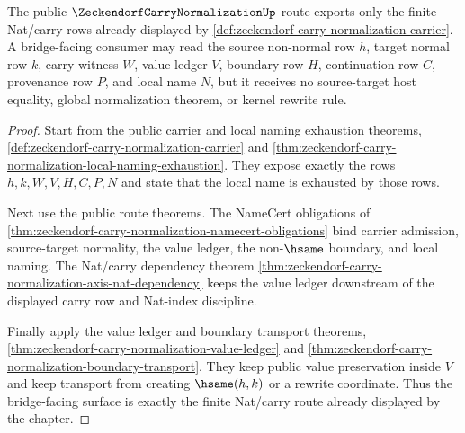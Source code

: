 \begin{theorem}
\label{thm:zeckendorf-carry-normalization-bridged-export}
The public $\ZeckendorfCarryNormalizationUp$ route exports only the finite Nat/carry rows already displayed by \autoref{def:zeckendorf-carry-normalization-carrier}. A bridge-facing consumer may read the source non-normal row $h$, target normal row $k$, carry witness $W$, value ledger $V$, boundary row $H$, continuation row $C$, provenance row $P$, and local name $N$, but it receives no source-target host equality, global normalization theorem, or kernel rewrite rule.
\end{theorem}
\begin{proof}
Start from the public carrier and local naming exhaustion theorems, \autoref{def:zeckendorf-carry-normalization-carrier} and \autoref{thm:zeckendorf-carry-normalization-local-naming-exhaustion}. They expose exactly the rows $h,k,W,V,H,C,P,N$ and state that the local name is exhausted by those rows.

Next use the public route theorems. The NameCert obligations of \autoref{thm:zeckendorf-carry-normalization-namecert-obligations} bind carrier admission, source-target normality, the value ledger, the non-$\hsame$ boundary, and local naming. The Nat/carry dependency theorem \autoref{thm:zeckendorf-carry-normalization-axis-nat-dependency} keeps the value ledger downstream of the displayed carry row and Nat-index discipline.

Finally apply the value ledger and boundary transport theorems, \autoref{thm:zeckendorf-carry-normalization-value-ledger} and \autoref{thm:zeckendorf-carry-normalization-boundary-transport}. They keep public value preservation inside $V$ and keep transport from creating $\hsame(h,k)$ or a rewrite coordinate. Thus the bridge-facing surface is exactly the finite Nat/carry route already displayed by the chapter.
\end{proof}

